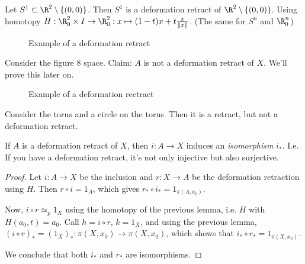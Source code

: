 \begin{eg}
    Let $S^1 \subset \R^2 \setminus \{(0, 0)\}$.
    Then $S^1$ is a deformation retract of $\R^2 \setminus \{ (0, 0)\} $.
    Using homotopy $H: \R^2_0 \times I \to \R^2_0: x \mapsto (1-t)x + t \frac{x}{\|x\|}$.
    (The same for $S^n$ and $\R^n_0$)
    \begin{figure}[H]
        \centering
        \caption{Example of a deformation retract}
        \label{fig:deformation-retract-example}
    \end{figure}
\end{eg}
\begin{eg}
    Consider the figure $8$ space.
    Claim: $A$ is not a deformation retract of $X$.
    We'll prove this later on.
\begin{figure}[H]
    \centering
    \caption{Example of a deformation rectract}
    \label{fig:deformation-rectract-example-2}
\end{figure}
\end{eg}

\begin{eg}
    Consider the torus and a circle on the torus.
    Then it is a retract, but not a deformation retract.
\end{eg}

\begin{theorem}
    If $A$ is a deformation retract of $X$, then $i : A \to X$ induces an \emph{isomorphism} $i_*$.
    I.e. If you have a deformation retract, it's not only injective but also surjective.
\end{theorem}
\begin{proof}
    Let $i:  A \to X$ be the inclusion and $r: X \to A$ be the deformation retraction using $H$.
    Then $r  \circ  i = 1_A$, which gives $r_*  \circ  i_* = 1_{\pi(A, a_0)}$.

    Now, $i  \circ  r \simeq_p  1_X$ using the homotopy of the previous lemma, i.e. $H$ with $H(a_0, t) = a_0$.
    Call $h = i  \circ  r$, $k = 1_X$, and using the previous lemma, $(i  \circ  r)_* = (1_X)_*: \pi(X, x_0) \to \pi(X, x_0)$, which shows that $i_*  \circ r_* = 1_{\pi(X, x_0)}$.

    We conclude that both $i_*$ and $r_*$ are isomorphisms.
\end{proof}

